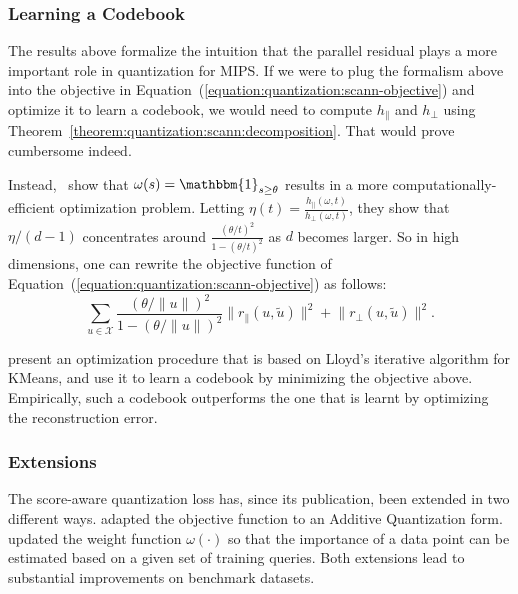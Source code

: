 \subsubsection{Learning a Codebook}

The results above formalize the intuition that the parallel residual plays a more important
role in quantization for MIPS. If we were to plug the formalism above into the objective
in Equation~(\ref{equation:quantization:scann-objective}) and optimize it to learn a codebook, we would
need to compute $h_\parallel$ and $h_\perp$ using Theorem~\ref{theorem:quantization:scann:decomposition}.
That would prove cumbersome indeed.

Instead,~\cite{scann} show that $\omega(s) = \mathbbm{1}_{s \geq \theta}$ results in a more
computationally-efficient optimization problem. 
Letting $\eta(t) = \frac{h_\parallel(\omega, t)}{h_\perp(\omega, t)}$,
they show that $\eta/(d-1)$ concentrates around $\frac{(\theta/t)^2}{1 - (\theta/t)^2}$
as $d$ becomes larger. So in high dimensions, one can rewrite the objective function
of Equation~(\ref{equation:quantization:scann-objective}) as follows:
\begin{equation*}
    \sum_{u \in \mathcal{X}} \frac{(\theta/\lVert u \rVert)^2}{1 - (\theta/\lVert u \rVert)^2}
    \lVert r_\parallel(u, \tilde{u}) \rVert^2 +
    \lVert r_\perp(u, \tilde{u}) \rVert^2.
\end{equation*}

\cite{scann} present an optimization procedure that is based on Lloyd's iterative algorithm for
KMeans, and use it to learn a codebook by minimizing the objective above.
Empirically, such a codebook outperforms the one that
is learnt by optimizing the reconstruction error.

\subsubsection{Extensions}
The score-aware quantization loss has, since its publication, been extended
in two different ways. \cite{Zhang_Liu_Lian_Liu_Wu_Chen_2022} adapted the objective
function to an Additive Quantization form. \cite{queryAwareQuantization}
updated the weight function $\omega(\cdot)$ so that the importance of a data point
can be estimated based on a given set of training queries. Both extensions lead
to substantial improvements on benchmark datasets.



